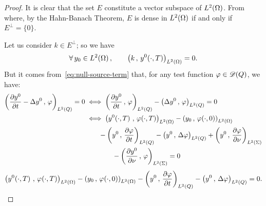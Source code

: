 \begin{proof}%
    It is clear that the set $E$ constitute a vector subspace of
    $L^{2}\!\left({\Omega}\right)$. From where, by the Hahn-Banach Theorem, $E$ is dense
    in $L^{2}\!\left({\Omega}\right)$ if and only if $E^{\perp} = \{0\}$.

    Let us consider $k\in E^{\perp}$; so we have
    \begin{equation*}\label{eq:proof-controllability-26}
        \forall\,y_{0}\in L^{2}\!\left({\Omega}\right),\qquad
        {\left({ k\,,\,y^{0}\!\left({\cdot,T}\right) }\right)}_{L^{2}\left({\Omega}\right)} = 0.
    \end{equation*}
    But it comes from~\eqref{eq:null-source-term} that, for any test
    function $\varphi\in\mathscr{D}(Q)$, we have:
    \begin{equation*}
        \begin{split}
            \scalaireq{\primetemps{y^{0}} - \Delta y^{0}}{\vphi} = 0 &\iff
            \scalaireq{\primetemps{y^{0}}}{\vphi} - \scalaireq{\Delta
            y^{0}}{\vphi} = 0\\
            &\iff \scalaireohm{%
                y^{0}\!\left({\cdot,T}\right)
            }{%
                \vphi\!\left({\cdot,T}\right)
            } - \scalaireohm{%
                y_{0}
            }{%
                \vphi\!\left({\cdot,0}\right)
            }\\
            &\qquad - \scalaireq{y^{0}}{\primetemps{\vphi}} - \scalaireq{y^{0}
            }{%
                \Delta \vphi
            } + \scalaires{y^{0}
            }{\deriveenormale{\vphi}
            }\\
            &\qquad\qquad - \scalaires{\deriveenormale{y^{0}}}{\vphi} = 0
        \end{split}
    \end{equation*}
    \ie{}
    \begin{equation}\label{eq:controllability-proof-30}
            \scalaireohm{%
                y^{0}\!\left({\cdot,T}\right)
            }{%
                \vphi\!\left({\cdot,T}\right)
            }%
            - \scalaireohm{%
                y_{0}
            }{%
                \vphi\!\left({\cdot,0}\right)
            } - \scalaireq{%
                y^{0}
            }{%
                \primetemps{\vphi}
            }%
            - \scalaireq{%
                y^{0}
            }{%
                \Delta\vphi
            } = 0.

\end{equation}
\end{proof}
